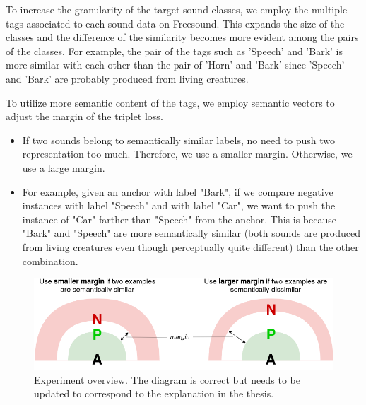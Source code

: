 To increase the granularity of the target sound classes, we employ the multiple tags associated to each sound data on Freesound. This expands the size of the classes and the difference of the similarity becomes more evident among the pairs of the classes. For example, the pair of the tags such as 'Speech' and 'Bark' is more similar with each other than the pair of 'Horn' and 'Bark' since 'Speech' and 'Bark' are probably produced from living creatures.

To utilize more semantic content of the tags, we employ semantic vectors to adjust the margin of the triplet loss.

\begin{itemize}
    \item If two sounds belong to semantically similar labels, no need to push two representation too much. Therefore, we use a smaller margin. Otherwise, we use a large margin.
    \item For example, given an anchor with label "Bark", if we compare negative instances with label "Speech" and with label "Car", we want to push the instance of "Car" farther than "Speech" from the anchor. This is because "Bark" and "Speech" are more semantically similar (both sounds are produced from living creatures even though perceptually quite different) than the other combination.
\end{itemize}

\begin{figure}[htb]
	\centering
	\includegraphics[width=15cm]{Figures/Adaptive_Margin.png}
	\caption{Experiment overview. The diagram is correct but needs to be updated to correspond to the explanation in the thesis.}
	\label{toc-figrue}
\end{figure}
